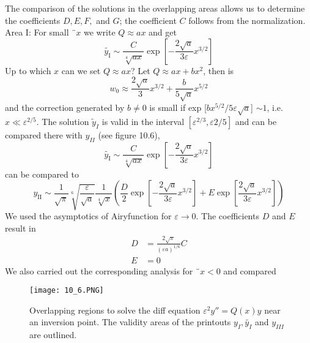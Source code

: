 The comparison of the solutions in the overlapping areas allows us to determine the coefficients $D, E, F,$ and $G$; the coefficient $C$ follows from the normalization. Area I: For small $¨ x$ we ​​write $Q \approx ax$ and get
\begin{equation}
    \widetilde{y_{\mathrm{I}}} \sim \frac{C}{\sqrt[4]{a x}} \exp \left[-\frac{2 \sqrt{a}}{3 \varepsilon} x^{3 / 2}\right]
    \end{equation}
Up to which $x$ can we set $Q \approx ax$? Let $Q \approx ax + bx^2$, then is
\begin{equation}
    w_{0} \approx \frac{2 \sqrt{a}}{3} x^{3 / 2}+\frac{b}{5 \sqrt{a}} x^{5 / 2}
    \end{equation}
and the correction generated by $b \neq 0$ is small if exp [$bx^{5 / 2} / 5\varepsilon\sqrt{a}$] $\sim 1$, i.e. $x\ll\varepsilon ^{2 / 5}$. The solution $\tilde{y}_I$ is valid in the interval $[\varepsilon^{2 / 3}, \varepsilon{2 / 5}]$ and can be compared there with $y_{II}$ (see figure 10.6),
\begin{equation}
    \widetilde{y_{\mathrm{I}}} \sim \frac{C}{\sqrt[4]{a x}} \exp \left[-\frac{2 \sqrt{a}}{3 \varepsilon} x^{3 / 2}\right]
    \end{equation}
can be compared to
\begin{equation}
    y_{\mathrm{II}} \sim \frac{1}{\sqrt{\pi}} \sqrt[6]{\frac{\varepsilon}{\sqrt{a}}} \frac{1}{\sqrt[4]{x}}\left(\frac{D}{2} \exp \left[-\frac{2 \sqrt{a}}{3 \varepsilon} x^{3 / 2}\right]+E \exp \left[\frac{2 \sqrt{a}}{3 \varepsilon} x^{3 / 2}\right]\right)
    \end{equation}
We used the asymptotics of Airyfunction for $\varepsilon\rightarrow 0$. The coefficients $D$ and $E$ result in
\begin{equation}
\begin{aligned} D &=\frac{2 \sqrt{\pi}}{(\varepsilon a)^{1 / 6}} C \\ E &=0 \end{aligned}
\end{equation}
We also carried out the corresponding analysis for $¨ x <0$ and compared
\begin{figure}[ht]
        \centering
        \texttt{[image: 10\_6.PNG]}
        \caption{Overlapping regions to solve the diff equation $\varepsilon^2y''=Q(x)y$ near an inversion point. The validity areas of the printouts $y_{I},\tilde{y_I}$ and $y_{III}$ are outlined.}
\end{figure}
